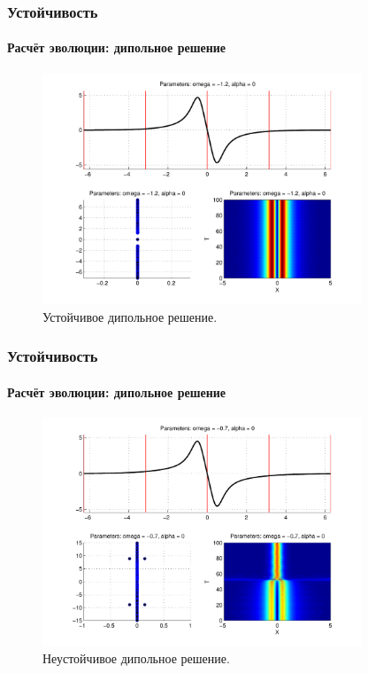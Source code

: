 \documentclass [10pt] {beamer}
\begin{document}
\begin{frame}
	\frametitle{Устойчивость}
	\framesubtitle{Расчёт эволюции: дипольное решение}
	
	\begin{figure}
		\includegraphics[width=0.85\textwidth]{pic/dipole_solution_stable.pdf}
		\caption{Устойчивое дипольное решение.}
		\label{pic:dipole_solution_stable}
	\end{figure}
\end{frame}

\begin{frame}
	\frametitle{Устойчивость}
	\framesubtitle{Расчёт эволюции: дипольное решение}
	
	\begin{figure}
		\includegraphics[width=0.85\textwidth]{pic/dipole_solution_unstable.pdf}
		\caption{Неустойчивое дипольное решение.}
		\label{pic:dipole_solution_unstable}
	\end{figure}
\end{frame}
\end{document}
